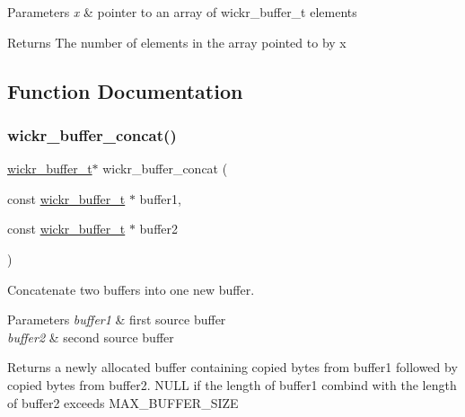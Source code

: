 \begin{DoxyParams}{Parameters}
{\em x} & pointer to an array of wickr\+\_\+buffer\+\_\+t elements \\
\hline
\end{DoxyParams}
\begin{DoxyReturn}{Returns}
The number of elements in the array pointed to by x 
\end{DoxyReturn}


\subsection{Function Documentation}
\mbox{\label{group__wickr__buffer_gad7721c1033a1fc378a0a11613f3cfb26}} 
\subsubsection{\texorpdfstring{wickr\_buffer\_concat()}{wickr\_buffer\_concat()}}
{\footnotesize\ttfamily \mbox{\hyperlink{structwickr__buffer}{wickr\+\_\+buffer\+\_\+t}}$\ast$ wickr\+\_\+buffer\+\_\+concat (\begin{DoxyParamCaption}\item[{const \mbox{\hyperlink{structwickr__buffer}{wickr\+\_\+buffer\+\_\+t}} $\ast$}]{buffer1,  }\item[{const \mbox{\hyperlink{structwickr__buffer}{wickr\+\_\+buffer\+\_\+t}} $\ast$}]{buffer2 }\end{DoxyParamCaption})}



Concatenate two buffers into one new buffer. 


\begin{DoxyParams}{Parameters}
{\em buffer1} & first source buffer \\
\hline
{\em buffer2} & second source buffer \\
\hline
\end{DoxyParams}
\begin{DoxyReturn}{Returns}
a newly allocated buffer containing copied bytes from \textquotesingle{}buffer1\textquotesingle{} followed by copied bytes from \textquotesingle{}buffer2\textquotesingle{}. N\+U\+LL if the length of \textquotesingle{}buffer1\textquotesingle{} combind with the length of \textquotesingle{}buffer2\textquotesingle{} exceeds M\+A\+X\+\_\+\+B\+U\+F\+F\+E\+R\+\_\+\+S\+I\+ZE 
\end{DoxyReturn}
\mbox{\label{group__wickr__buffer_ga3aa7ea751a65310184d6c0ea9627dca8}} 
